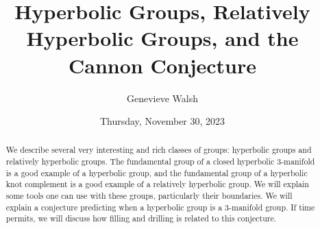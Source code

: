 \documentclass{UAmathtalk}
\author{Genevieve Walsh}
\title{Hyperbolic Groups, Relatively Hyperbolic Groups, and the Cannon Conjecture}
\date{Thursday, November 30, 2023}
\begin{document}
\maketitle

\begin{abstract}
We describe several very interesting and rich classes of groups: hyperbolic groups and relatively hyperbolic groups. The fundamental group of a closed hyperbolic $3$-manifold is a good example of a hyperbolic group, and the fundamental group of a hyperbolic knot complement is a good example of a relatively hyperbolic group. We will explain some tools one can use with these groups, particularly their boundaries. We will explain a conjecture predicting when a hyperbolic group is a 3-manifold group. If time permits, we will discuss how filling and drilling is related to this conjecture.
\end{abstract}
\end{document}
